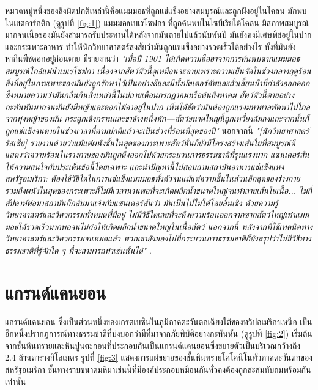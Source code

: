 \documentclass[10pt,twocolumn,letterpaper]{article}
\begin{document}
หมวดหมู่หนึ่งของสิ่งผิดปกติเหล่านี้คือแมมมอธที่ถูกแช่แข็งอย่างสมบูรณ์และถูกฝังอยู่ในโคลน มักพบในเขตอาร์กติก (ดูรูปที่ \ref{fig:1}) แมมมอธเบเรโซฟกา ที่ถูกค้นพบในไซบีเรียใต้โคลน มีสภาพสมบูรณ์มากจนเนื้อของมันยังสามารถรับประทานได้หลังจากมันตายไปแล้วนับพันปี มันยังคงมีเศษพืชอยู่ในปากและกระเพาะอาหาร ทำให้นักวิทยาศาสตร์สงสัยว่ามันถูกแช่แข็งอย่างรวดเร็วได้อย่างไร ทั้งที่มันยังหากินพืชดอกอยู่ก่อนตาย \cite{17} มีรายงานว่า \textit{"เมื่อปี 1901 ได้เกิดความฮือฮาจากการค้นพบซากแมมมอธสมบูรณ์ใกล้แม่น้ำเบเรโซฟกา เนื่องจากสัตว์ตัวนี้ดูเหมือนจะตายเพราะความเย็นจัดในช่วงกลางฤดูร้อน สิ่งที่อยู่ในกระเพาะของมันยังถูกรักษาไว้เป็นอย่างดีและมีทั้งบัตเตอร์คัพและถั่วเสี้ยนป่าที่กำลังออกดอก ซึ่งหมายความว่ามันกลืนกินสิ่งเหล่านี้ในปลายเดือนกรกฎาคมหรือต้นสิงหาคม สัตว์ตัวนี้ตายอย่างกะทันหันมากจนมันยังมีหญ้าและดอกไม้คาอยู่ในปาก เห็นได้ชัดว่ามันต้องถูกแรงมหาศาลพัดพาไปไกลจากทุ่งหญ้าของมัน กระดูกเชิงกรานและขาข้างหนึ่งหัก—สัตว์ขนาดใหญ่นี้ถูกเหวี่ยงล้มลงและจากนั้นก็ถูกแช่แข็งจนตายในช่วงเวลาที่ตามปกติแล้วจะเป็นช่วงที่ร้อนที่สุดของปี"} \cite{18} นอกจากนี้ \textit{"[นักวิทยาศาสตร์รัสเซีย] รายงานด้วยว่าแม้แต่ผนังชั้นในสุดของกระเพาะสัตว์นั้นก็ยังมีโครงสร้างเส้นใยที่สมบูรณ์ดี แสดงว่าความร้อนในร่างกายของมันถูกดึงออกไปด้วยกระบวนการธรรมชาติที่รุนแรงมาก แซนเดอร์สันให้ความสนใจกับประเด็นข้อนี้โดยเฉพาะ และนำปัญหานี้ไปสอบถามสถาบันอาหารแช่แข็งแห่งสหรัฐอเมริกา: ต้องใช้วิธีใดในการแช่แข็งแมมมอธทั้งตัวจนแม้แต่ความชื้นในส่วนลึกสุดของร่างกาย รวมถึงผนังในสุดของกระเพาะก็ไม่มีเวลานานพอที่จะเกิดผลึกน้ำขนาดใหญ่จนทำลายเส้นใยเนื้อ... ไม่กี่สัปดาห์ต่อมาสถาบันก็กลับมาแจ้งกับแซนเดอร์สันว่า มันเป็นไปไม่ได้โดยสิ้นเชิง ด้วยความรู้วิทยาศาสตร์และวิศวกรรมทั้งหมดที่มีอยู่ ไม่มีวิธีใดเลยที่จะดึงความร้อนออกจากซากสัตว์ใหญ่เท่าแมมมอธได้รวดเร็วมากพอจนไม่ก่อให้เกิดผลึกน้ำขนาดใหญ่ในเนื้อสัตว์ นอกจากนี้ หลังจากที่ใช้เทคนิคทางวิทยาศาสตร์และวิศวกรรมจนหมดแล้ว พวกเขายังมองไปที่กระบวนกาาธรรมชาติก็ยังสรุปว่าไม่มีวิธีทางธรรมชาติที่รู้จักใด ๆ ที่จะสามารถทำเช่นนั้นได้"} \cite{19}.

\section{แกรนด์แคนยอน}

แกรนด์แคนยอน ซึ่งเป็นส่วนหนึ่งของเกรตเบซินในภูมิภาคตะวันตกเฉียงใต้ของทวีปอเมริกาเหนือ เป็นอีกหนึ่งปรากฏการณ์ทางธรรมชาติที่บ่งบอกว่ามีที่มาจากภัยพิบัติอย่างกะทันหัน (ดูรูปที่ \ref{fig:2}) เริ่มต้นจากชั้นหินทรายและหินปูนตะกอนที่ประกอบกันเป็นแกรนด์แคนยอนซึ่งขยายตัวเป็นบริเวณกว้างถึง 2.4 ล้านตารางกิโลเมตร \cite{21} รูปที่ \ref{fig:3} แสดงการแผ่ขยายของชั้นหินทรายโคโคนิโนทั่วภาคตะวันตกของสหรัฐอเมริกา ชั้นทางราบขนาดมหึมาเช่นนี้ที่มีองค์ประกอบหมือนกันทั่วคงต้องถูกสะสมทับถมพร้อมกันเท่านั้น
\end{document}

